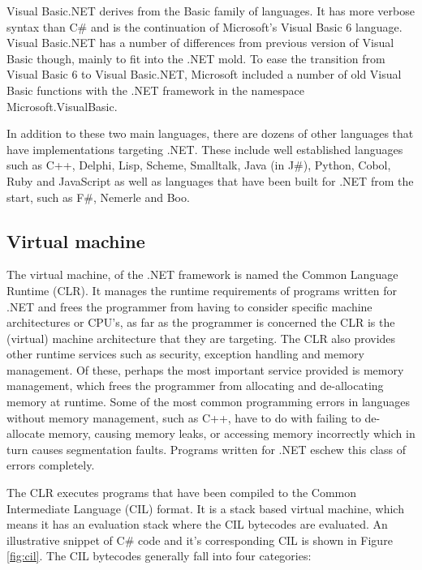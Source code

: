 	Visual Basic.NET derives from the Basic family of languages. It has more 
	verbose syntax than C\# and is the continuation of Microsoft's Visual Basic 
	6 language. Visual Basic.NET has a number of differences from previous 
	version of Visual Basic though, mainly to fit into the .NET mold. To ease 
	the transition from Visual Basic 6 to Visual Basic.NET, Microsoft included a 
	number of old Visual Basic functions with the .NET framework in the 
	namespace Microsoft.VisualBasic. 
	
	In addition to these two main languages, there are dozens of other 
	languages that have implementations targeting .NET. These include well 
	established languages such as C++, Delphi, Lisp, Scheme, Smalltalk, Java 
	(in J\#), Python, Cobol, Ruby and JavaScript as well as languages that have 
	been built for .NET from the start, such as F\#, Nemerle and Boo.

\subsection{Virtual machine}

	The virtual machine, of the .NET framework is named the Common Language 
	Runtime (CLR). It manages the runtime requirements of programs written for 
	.NET and frees the programmer from having to consider specific machine 
	architectures or CPU's, as far as the programmer is concerned the CLR is the 
	(virtual) machine architecture that they are targeting. The CLR also 
	provides other runtime services such as security, exception handling and 
	memory management. Of these, perhaps the most important service provided is 
	memory management, which frees the programmer from allocating and 
	de-allocating memory at runtime. Some of the most common programming errors 
	in languages without memory management, such as C++, have to do with failing 
	to de-allocate memory, causing memory leaks, or accessing memory incorrectly 
	which in turn causes segmentation faults. Programs written for .NET eschew 
	this class of errors completely.
	
	The CLR executes programs that have been compiled to the Common Intermediate 
	Language (CIL) format. It is a stack based virtual machine, which means it 
	has an evaluation stack where the CIL bytecodes are evaluated. An 
	illustrative snippet of C\# code and it's corresponding CIL is shown in 
	Figure \ref{fig:cil}. The CIL bytecodes generally fall into four categories:
		
